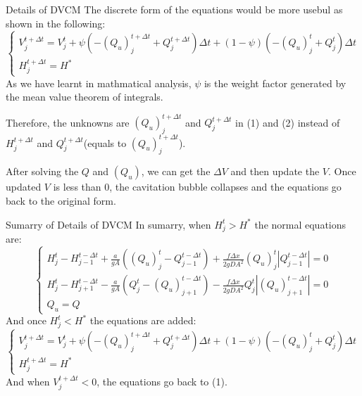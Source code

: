 \documentclass[UTF8]{ctexbeamer}
\begin{document}
\begin{frame}{Details of DVCM}
    The discrete form of the equations would be more usebul as shown in the following:
    \begin{equation}
        \begin{cases}
            V^{t+\Delta t}_j = V^t_j +\psi (-{(Q_u)}^{t+\Delta t}_j+Q^{t+\Delta t}_j)\Delta t+(1-\psi)(-{(Q_u)}^{t}_j+Q^{t}_j)\Delta t\\
            H^{t+\Delta t}_j = H^*
        \end{cases}
    \end{equation}
    \qquad As we have learnt in mathmatical analysis, $\psi$ is the weight factor generated by the mean value theorem of integrals.
    
    \qquad Therefore, the unknowns are $(Q_u)^{t+\Delta t}_j$ and $Q^{t+\Delta t}_j$ in (1) and (2) instead of $H^{t+\Delta t}_j$ and $Q^{t+\Delta t}_j$(equals to ${(Q_u)}^{t+\Delta t}_j$).

    \qquad After solving the $Q$ and ${(Q_u)}$, we can get the $\Delta V$ and then update the $V$. Once updated $V$ is less than 0, the cavitation bubble collapses and the equations go back to the original form. 
\end{frame}

\begin{frame}{Sumarry of Details of DVCM}
    In sumarry, when $H^{t}_j > H^*$ the normal equations are:
    \begin{equation}
        \tag{1}
        \begin{cases}
            H^t_j-H^{t-\Delta t}_{j-1}+\frac{a}{gA}({(Q_u)}^t_j-Q^{t-\Delta t}_{j-1})+\frac{f\Delta x}{2 g D A^2}{(Q_u)}^t_j|Q^{t-\Delta t}_{j-1}|=0\\
            H^t_j-H^{t-\Delta t}_{j+1}-\frac{a}{gA}(Q^t_j-{(Q_u)}^{t-\Delta t}_{j+1})-\frac{f\Delta x}{2 g D A^2}Q^t_j|{(Q_u)}^{t-\Delta t}_{j+1}|=0\\
            Q_u = Q
        \end{cases}
    \end{equation}
    And once $H^{t}_j < H^*$ the equations are added:
    \begin{equation}
        \tag{2}
        \begin{cases}
            V^{t+\Delta t}_j = V^t_j +\psi (-{(Q_u)}^{t+\Delta t}_j+Q^{t+\Delta t}_j)\Delta t+(1-\psi)(-{(Q_u)}^{t}_j+Q^{t}_j)\Delta t\\
            H^{t+\Delta t}_j = H^*
        \end{cases}
    \end{equation}
    And when $V^{t+\Delta t}_j < 0$, the equations go back to (1).
\end{frame}
\end{document}
